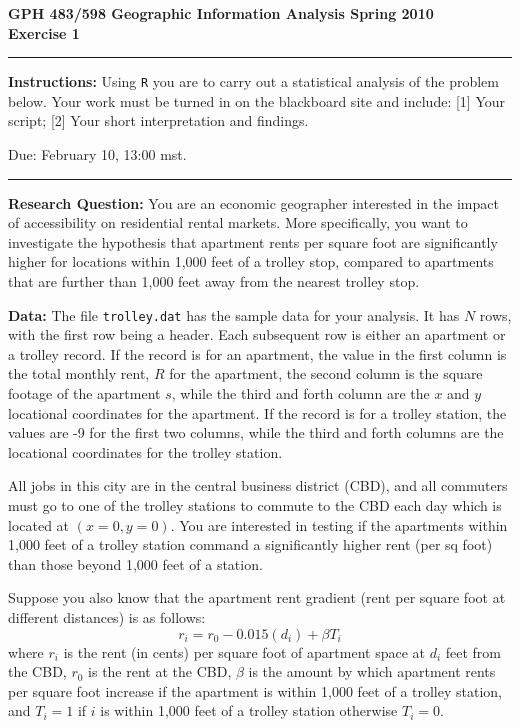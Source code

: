 \documentclass{article} %
\begin{document}
{\large \bf GPH 483/598 Geographic Information Analysis \hfill Spring 2010\\
\hfill Exercise 1}
\vspace{.2in}
\hrule 
\vspace{.1in} 
\textbf{Instructions:} Using \texttt{R} you are to carry out a statistical
analysis of the problem below. Your work must be turned in on the blackboard
site and include: [1] Your script; [2] Your short interpretation and findings.

Due: February 10, 13:00 mst. 
\vspace{.1in}
\hrule 
\vspace{.2in}
{\bf Research Question:} You are an economic geographer interested in the
impact of accessibility on residential rental markets.
More specifically, you want to investigate the hypothesis
that apartment rents per square foot are significantly higher for locations
within 1,000 feet  of a trolley stop, compared to apartments  that
are further than 1,000 feet away from the nearest trolley stop.

\vspace{.2in}

{\bf Data:} The file \texttt{trolley.dat} has the sample data for your
analysis. It has $N$ rows, with the first row being a header. Each subsequent
row is either an apartment  or a trolley record. If the record is for an
apartment, the value in the first column is the
total monthly rent, $R$ for the apartment, the second column is the square
footage of the apartment $s$, while the third and forth column are the $x$ and
$y$ locational coordinates for the apartment. If the record is for a trolley
station, the values are -9 for the first two columns, while the third
and forth columns are the locational coordinates for the trolley station.

\vspace{.2in}

All jobs in this city are in the central business district (CBD), and all
commuters must go to one of the trolley stations to commute to the CBD each
day which is located at $(x=0,y=0)$.  You are interested in testing if the
apartments within 1,000 feet of a trolley station command a
significantly higher rent (per sq foot) than those beyond 1,000 feet of a
station.

\vspace{.2in}
Suppose you also know that the apartment rent gradient (rent per square foot
at different distances) is as follows:
\begin{equation}
  r_{i}=r_0-0.015 (d_i) + \beta T_i
  \label{e:r}
\end{equation}
where $r_{i}$ is the rent (in cents) per square foot of apartment space at
$d_i$ feet from the CBD, $r_0$ is the rent at the CBD, $\beta$  is the amount by which apartment rents per
square foot increase if the apartment is within 1,000 feet of a trolley
station, and $T_i=1$ if $i$ is within 1,000 feet of a trolley station
otherwise $T_i=0$. 
\end{document}
